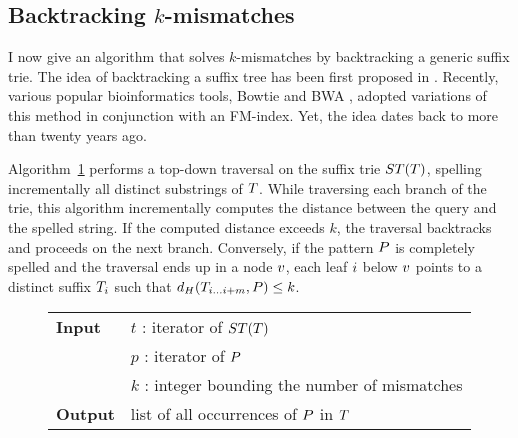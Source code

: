 \subsection{Backtracking $k$-mismatches}
\label{sec:index:algo:kmismatches}

I now give an algorithm that solves $k$-mismatches by backtracking a generic suffix trie.
The idea of backtracking a suffix tree has been first proposed in \citep{Ukkonen1993}.
Recently, various popular bioinformatics tools, \eg Bowtie \citep{Langmead2009} and BWA \citep{Li2009}, adopted variations of this method in conjunction with an FM-index.
Yet, the idea dates back to more than twenty years ago.

Algorithm~\ref{alg:st-hamming} performs a top-down traversal on the suffix trie $ST(T)$, spelling incrementally all distinct substrings of $T$.
While traversing each branch of the trie, this algorithm incrementally computes the distance between the query and the spelled string.
If the computed distance exceeds $k$, the traversal backtracks and proceeds on the next branch.
Conversely, if the pattern $P$ is completely spelled and the traversal ends up in a node $v$, each leaf $i$ below $v$ points to a distinct suffix ${T}_{i}$ such that $d_H({T}_{{i}\dots{i+m}}, P) \leq k$.

\begin{figure*}[t]
\begin{center}
\begin{minipage}[t]{.8\textwidth}
\begin{algorithm}[H]
\begin{tabular}{ll}
\textbf{Input}  & $t$ : iterator of $ST(T)$\\
 			    & $p$ : iterator of $P$\\
 			    & $k$ : integer bounding the number of mismatches\\
\textbf{Output} & list of all occurrences of $P$ in $T$\\
\end{tabular}
\begin{algorithmic}[1]
\Else
		\State \Report {}
		\Repeat
			\State {}
			\State {}
			\State {}
		\Until {}
	\EndIf
\EndIf
\end{algorithmic}
\label{alg:st-hamming}
\end{algorithm}
\end{minipage}
\end{center}
\end{figure*}

